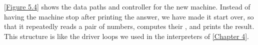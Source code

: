 \cref{Figure 5.4} shows the data paths and controller for the new  machine.
Instead of having the machine stop after printing the answer, we have made it start over, so that it repeatedly reads a pair of numbers, computes their , and prints the result.
This structure is like the driver loops we used in the interpreters of \cref{Chapter 4}.
